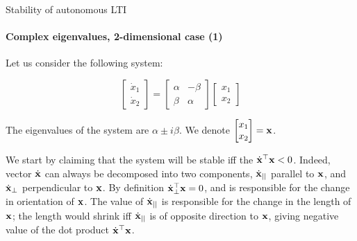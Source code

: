 \documentclass{beamer}
\begin{document}
\begin{frame}{Stability of autonomous LTI}
\framesubtitle{Complex eigenvalues, 2-dimensional case (1)}
\begin{flushleft}

Let us consider the following system:

\begin{equation}
\begin{bmatrix}
    \dot{x}_1 \\ \dot{x}_2
\end{bmatrix}
     = 
\begin{bmatrix}
    \alpha & -\beta \\ \beta & \alpha
\end{bmatrix}     
\begin{bmatrix}
    x_1 \\ x_2
\end{bmatrix}
\end{equation}

The eigenvalues of the system are $\alpha \pm i \beta$. We denote $\begin{bmatrix}
    x_1 \\ x_2
\end{bmatrix} = \mathbf{x}$.

\bigskip

We start by claiming that the system will be stable iff the $\dot{\mathbf{x}}^\top \mathbf{x} < 0$. Indeed, vector $\dot{\mathbf{x}}$ can always be decomposed into two components, $\dot{\mathbf{x}}_{||}$ parallel to $\mathbf{x}$, and $\dot{\mathbf{x}}_{\perp}$ perpendicular to $\mathbf{x}$. By definition $\dot{\mathbf{x}}_{\perp}^\top \mathbf{x} = 0$, and is responsible for the change in orientation of $\mathbf{x}$. The value of $\dot{\mathbf{x}}_{||}$ is responsible for the change in the length of $\mathbf{x}$; the length would shrink iff $\dot{\mathbf{x}}_{||}$ is of opposite direction to $\mathbf{x}$, giving negative value of the dot product $\dot{\mathbf{x}}^\top \mathbf{x}$.

\end{flushleft}
\end{frame}
\end{document}
